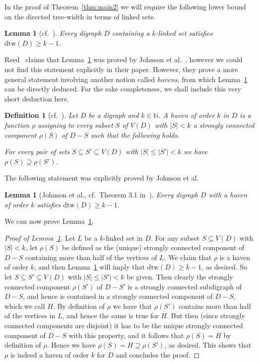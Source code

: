\documentclass[a4paper,10pt]{article}
\newtheorem{definition}{Definition}
\newtheorem{lemma}[theorem]{Lemma}
\begin{document}
In the proof of Theorem~\ref{thm:main2} we will require the following lower bound on the directed tree-width in terms of linked sets.

\begin{lemma}[cf.~\cite{MR1966425}]\label{lem:linked}
Every digraph $D$ containing a $k$-linked set satisfies $\mathrm{dtw}(D)\ge k-1$.
\end{lemma}

Reed~\cite{MR1966425} claims that Lemma~\ref{lem:linked} was proved by Johnson et al.~\cite{MR1828440}, however we could not find this statement explicitly in their paper. However, they prove a more general statement involving another notion called \emph{havens}, from which Lemma~\ref{lem:linked} can be directly deduced. For the sake completeness, we shall include this very short deduction here.

\begin{definition}[cf.~\cite{MR1828440}]
Let $D$ be a digraph and $k\in \mathbb{N}$. A \emph{haven of order $k$} in $D$ is a function $\rho$ assigning to every subset $S$ of $V(D)$ with $|S|<k$ a strongly connected component $\rho(S)$ of $D-S$ such that the following holds.

For every pair of sets $S\subseteq S'\subseteq V(D)$ with $|S|\le |S'|<k$ we have $\rho(S)\supseteq \rho(S')$.
\end{definition}
The following statement was explicitly proved by Johnson et al.
\begin{lemma}[Johnson et al., cf.~Theorem 3.1 in~\cite{MR1828440}]\label{lem:johnson1}
Every digraph $D$ with a haven of order $k$ satisfies $\mathrm{dtw}(D)\ge k-1$.  
\end{lemma}
We can now prove Lemma~\ref{lem:linked}. 
\begin{proof}[Proof of Lemma~\ref{lem:linked}]
Let $L$ be a $k$-linked set in $D$. For any subset $S\subseteq V(D)$ with $|S|<k$, let $\rho(S)$ be defined as the (unique) strongly connected component of $D-S$ containing more than half of the vertices of $L$. We claim that $\rho$ is a haven of order $k$, and then Lemma~\ref{lem:johnson1} will imply that $\mathrm{dtw}(D)\ge k-1$, as desired. So let $S\subseteq S'\subseteq V(D)$ with $|S|\le |S'|<k$ be given. Then clearly the strongly connected component $\rho(S')$ of $D-S'$ is a strongly connected subdigraph of $D-S$, and hence is contained in a strongly connected component of $D-S$, which we call $H$. By definition of $\rho$ we have that $\rho(S')$ contains more than half of the vertices in $L$, and hence the same is true for $H$. But then (since strongly connected components are disjoint) it has to be the unique strongly connected component of $D-S$ with this property, and it follows that $\rho(S)=H$ by definition of $\rho$. Hence we have $\rho(S)=H\supseteq \rho(S')$, as desired. This shows that $\rho$ is indeed a haven of order $k$ for $D$ and concludes the proof.
\end{proof}
\end{document}
